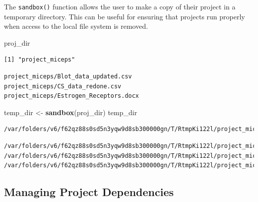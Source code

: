 \documentclass[12pt,twoside]{reedthesis}
\newenvironment{Shaded}{\begin{snugshade}}{\end{snugshade}}
\newcommand{\KeywordTok}[1]{\textcolor[rgb]{0.13,0.29,0.53}{\textbf{#1}}}
\newcommand{\DecValTok}[1]{\textcolor[rgb]{0.00,0.00,0.81}{#1}}
\newcommand{\StringTok}[1]{\textcolor[rgb]{0.31,0.60,0.02}{#1}}
\newcommand{\OperatorTok}[1]{\textcolor[rgb]{0.81,0.36,0.00}{\textbf{#1}}}
\newcommand{\NormalTok}[1]{#1}
\begin{document}
The \texttt{sandbox()} function allows the user to make a copy of their
project in a temporary directory. This can be useful for ensuring that
projects run properly when access to the local file system is removed.
\begin{Shaded}
\begin{Highlighting}[]
\NormalTok{proj_dir}
\end{Highlighting}
\end{Shaded}
\begin{verbatim}
[1] "project_miceps"
\end{verbatim}
\begin{Shaded}
\end{Shaded}
\begin{verbatim}
project_miceps/Blot_data_updated.csv
project_miceps/CS_data_redone.csv
project_miceps/Estrogen_Receptors.docx
\end{verbatim}
\begin{Shaded}
\begin{Highlighting}[]
\NormalTok{temp_dir <-}\StringTok{ }\KeywordTok{sandbox}\NormalTok{(proj_dir)}
\NormalTok{temp_dir}
\end{Highlighting}
\end{Shaded}
\begin{verbatim}
/var/folders/v6/f62qz88s0sd5n3yqw9d8sb300000gn/T/RtmpKi122l/project_miceps
\end{verbatim}
\begin{Shaded}
\end{Shaded}
\begin{verbatim}
/var/folders/v6/f62qz88s0sd5n3yqw9d8sb300000gn/T/RtmpKi122l/project_miceps/Blot_data_updated.csv
/var/folders/v6/f62qz88s0sd5n3yqw9d8sb300000gn/T/RtmpKi122l/project_miceps/CS_data_redone.csv
/var/folders/v6/f62qz88s0sd5n3yqw9d8sb300000gn/T/RtmpKi122l/project_miceps/Estrogen_Receptors.docx
\end{verbatim}
\subsection{Managing Project
Dependencies}\label{managing-project-dependencies}
\end{document}
